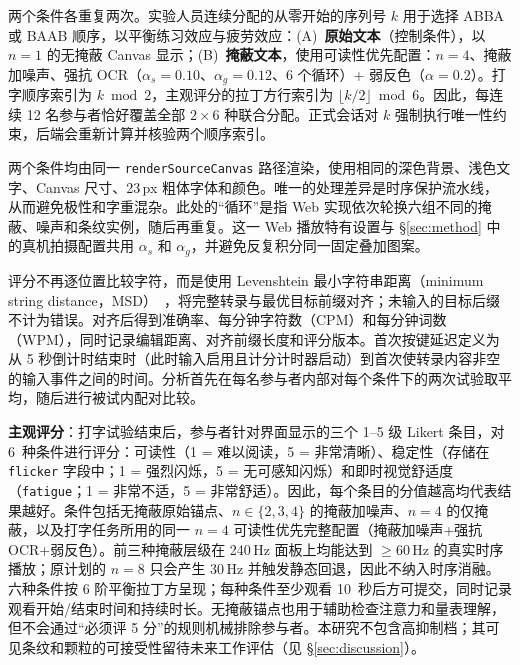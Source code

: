 \documentclass{ieeeaccess}
\begin{document}
{两个条件各重复两次。实验人员连续分配的从零开始的序列号 $k$ 用于选择 ABBA 或 BAAB 顺序，以平衡练习效应与疲劳效应：(A)~\textbf{原始文本}（控制条件），以 $n=1$ 的无掩蔽 Canvas 显示；(B)~\textbf{掩蔽文本}，使用可读性优先配置：$n=4$、掩蔽加噪声、强抗 OCR（$\alpha_s=0.10$、$\alpha_g=0.12$、6 个循环）+ 弱反色（$\alpha=0.2$）。打字顺序索引为 $k\bmod2$，主观评分的拉丁方行索引为 $\lfloor k/2\rfloor\bmod6$。因此，每连续 12 名参与者恰好覆盖全部 $2\times6$ 种联合分配。正式会话对 $k$ 强制执行唯一性约束，后端会重新计算并核验两个顺序索引。

两个条件均由同一 \texttt{render\allowbreak Source\allowbreak Canvas} 路径渲染，使用相同的深色背景、浅色文字、Canvas 尺寸、23\,px 粗体字体和颜色。唯一的处理差异是时序保护流水线，从而避免极性和字重混杂。此处的“循环”是指 Web 实现依次轮换六组不同的掩蔽、噪声和条纹实例，随后再重复。这一 Web 播放特有设置与 \S\ref{sec:method} 中的真机拍摄配置共用 $\alpha_s$ 和 $\alpha_g$，并避免反复积分同一固定叠加图案。

评分不再逐位置比较字符，而是使用 Levenshtein 最小字符串距离（minimum string distance，MSD）~\cite{b_soukoreff2003}，将完整转录与最优目标前缀对齐；未输入的目标后缀不计为错误。对齐后得到准确率、每分钟字符数（CPM）和每分钟词数（WPM），同时记录编辑距离、对齐前缀长度和评分版本。首次按键延迟定义为从 5 秒倒计时结束时（此时输入启用且计分计时器启动）到首次使转录内容非空的输入事件之间的时间。分析首先在每名参与者内部对每个条件下的两次试验取平均，随后进行被试内配对比较。

\textbf{主观评分}：打字试验结束后，参与者针对界面显示的三个 1--5 级 Likert 条目，对 6~种条件进行评分：可读性（1 = 难以阅读，5 = 非常清晰）、稳定性（存储在 \texttt{flicker} 字段中；1 = 强烈闪烁，5 = 无可感知闪烁）和即时视觉舒适度（\texttt{fatigue}；1 = 非常不适，5 = 非常舒适）。因此，每个条目的分值越高均代表结果越好。条件包括无掩蔽原始锚点、$n\in\{2,3,4\}$ 的掩蔽加噪声、$n=4$ 的仅掩蔽，以及打字任务所用的同一 $n=4$ 可读性优先完整配置（掩蔽加噪声+强抗 OCR+弱反色）。前三种掩蔽层级在 240\,Hz 面板上均能达到 $\geq$60\,Hz 的真实时序播放；原计划的 $n=8$ 只会产生 30\,Hz 并触发静态回退，因此不纳入时序消融。六种条件按 6 阶平衡拉丁方呈现；每种条件至少观看 10~秒后方可提交，同时记录观看开始/结束时间和持续时长。无掩蔽锚点也用于辅助检查注意力和量表理解，但不会通过“必须评 5 分”的规则机械排除参与者。本研究不包含高抑制档；其可见条纹和颗粒的可接受性留待未来工作评估（见 \S\ref{sec:discussion}）。

}
\end{document}
